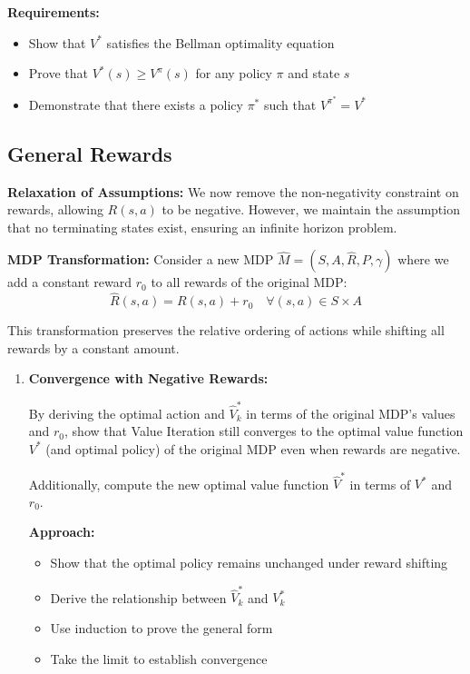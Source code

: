 \documentclass[12pt]{article}
\begin{document}
{{\begin{enumerate}
    \textbf{Requirements:}
    \begin{itemize}
        \item Show that \( V^* \) satisfies the Bellman optimality equation
        \item Prove that \( V^*(s) \geq V^\pi(s) \) for any policy \( \pi \) and state \( s \)
        \item Demonstrate that there exists a policy \( \pi^* \) such that \( V^{\pi^*} = V^* \)
    \end{itemize}
\end{enumerate}
\subsection{General Rewards}
\label{subsec:general_rewards}

\textbf{Relaxation of Assumptions:} We now remove the non-negativity constraint on rewards, allowing \( R(s, a) \) to be negative. However, we maintain the assumption that no terminating states exist, ensuring an infinite horizon problem.

\textbf{MDP Transformation:} Consider a new MDP \( \hat{M} = (S, A, \hat{R}, P, \gamma) \) where we add a constant reward \( r_0 \) to all rewards of the original MDP:
\begin{equation}
\hat{R}(s, a) = R(s, a) + r_0 \quad \forall (s, a) \in S \times A
\end{equation}

This transformation preserves the relative ordering of actions while shifting all rewards by a constant amount.

\begin{enumerate}[resume*]
    \item \textbf{Convergence with Negative Rewards:}
    
    By deriving the optimal action and \( \hat{V}^*_k \) in terms of the original MDP's values and \( r_0 \), show that Value Iteration still converges to the optimal value function \( V^* \) (and optimal policy) of the original MDP even when rewards are negative.
    
    Additionally, compute the new optimal value function \( \hat{V}^* \) in terms of \( V^* \) and \( r_0 \).
    
    \textbf{Approach:}
    \begin{itemize}
        \item Show that the optimal policy remains unchanged under reward shifting
        \item Derive the relationship between \( \hat{V}^*_k \) and \( V^*_k \)
        \item Use induction to prove the general form
        \item Take the limit to establish convergence
    \end{itemize}
    

\end{enumerate}}}
\end{document}
